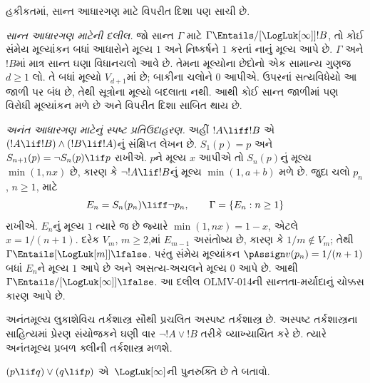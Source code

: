 \documentclass[../../../include/open-logic-section]{subfiles}
\begin{document}
હકીકતમાં, સાન્ત આધારગણ માટે વિપરીત દિશા પણ સાચી છે.

\emph{સાન્ત આધારગણ માટેની દલીલ.}
જો સાન્ત $\Gamma$ માટે $\Gamma\Entails/[\LogLuk[\infty]]!B$,
તો કોઈ સંમેય મૂલ્યાંકન બધાં આધારોને મૂલ્ય $1$ અને
નિષ્કર્ષને $1$ કરતાં નાનું મૂલ્ય આપે છે. $\Gamma$ અને $!B$માં
માત્ર સાન્ત ઘણા વિધાનચલો આવે છે. તેમના મૂલ્યોના છેદોનો
એક સામાન્ય ગુણજ $d\ge1$ લો. તે બધાં મૂલ્યો $V_{d+1}$માં છે;
બાકીના ચલોને $0$ આપીએ. ઉપરનાં સત્યવિધેયો આ જાળી પર બંધ છે,
તેથી સૂત્રોના મૂલ્યો બદલાતા નથી. આથી કોઈ સાન્ત જાળીમાં
પણ વિરોધી મૂલ્યાંકન મળે છે અને વિપરીત દિશા સાબિત થાય છે.

\emph{અનંત આધારગણ માટેનું સ્પષ્ટ પ્રતિઉદાહરણ.}
અહીં $!A\liff!B$ એ $(!A\lif!B)\land(!B\lif!A)$નું સંક્ષિપ્ત
લેખન છે. $S_1(p)=p$ અને
$S_{n+1}(p)=\lnot S_n(p)\lif p$ રાખીએ. $p$ને મૂલ્ય $x$ આપીએ
તો $S_n(p)$નું મૂલ્ય $\min(1,nx)$ છે, કારણ કે
$\lnot !A\lif!B$નું મૂલ્ય $\min(1,a+b)$ મળે છે.
જુદા ચલો $p_n$, $n\ge1$, માટે
\[
 E_n=S_n(p_n)\liff\lnot p_n,\qquad
 \Gamma=\{E_n:n\ge1\}
\]
રાખીએ. $E_n$નું મૂલ્ય $1$ ત્યારે જ છે જ્યારે
$\min(1,nx)=1-x$, એટલે $x=1/(n+1)$.
દરેક $V_m$, $m\ge2$,માં $E_{m-1}$ અસંતોષ્ય છે,
કારણ કે $1/m\notin V_m$; તેથી
$\Gamma\Entails[\LogLuk[m]]\lfalse$.
પરંતુ સંમેય મૂલ્યાંકન $\pAssign v(p_n)=1/(n+1)$ બધાં
$E_n$ને મૂલ્ય $1$ આપે છે અને અસત્ય-અચલને મૂલ્ય $0$ આપે છે.
આથી $\Gamma\Entails/[\LogLuk[\infty]]\lfalse$.
આ દલીલ OLMV-014ની સાન્તતા-મર્યાદાનું ચોક્કસ કારણ આપે છે.

અનંતમૂલ્ય લુકાશેવિચ તર્કશાસ્ત્ર સૌથી પ્રચલિત અસ્પષ્ટ
તર્કશાસ્ત્ર છે. અસ્પષ્ટ તર્કશાસ્ત્રના સાહિત્યમાં પ્રેરણ સંયોજકને
ઘણી વાર $\lnot !A \lor !B$ તરીકે વ્યાખ્યાયિત કરે છે. ત્યારે
અનંતમૂલ્ય પ્રબળ ક્લીની તર્કશાસ્ત્ર મળશે.

\begin{prob}
  $(p \lif q) \lor (q \lif p)$ એ~$\LogLuk[\infty]$ની
  પુનરુક્તિ છે તે બતાવો.
\end{prob}
\end{document}

